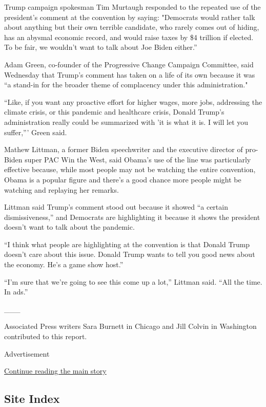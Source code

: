Trump campaign spokesman Tim Murtaugh responded to the repeated use of
the president's comment at the convention by saying: "Democrats would
rather talk about anything but their own terrible candidate, who rarely
comes out of hiding, has an abysmal economic record, and would raise
taxes by \$4 trillion if elected. To be fair, we wouldn't want to talk
about Joe Biden either.''

Adam Green, co-founder of the Progressive Change Campaign Committee,
said Wednesday that Trump's comment has taken on a life of its own
because it was ``a stand-in for the broader theme of complacency under
this administration."

``Like, if you want any proactive effort for higher wages, more jobs,
addressing the climate crisis, or this pandemic and healthcare crisis,
Donald Trump's administration really could be summarized with 'it is
what it is. I will let you suffer,''' Green said.

Mathew Littman, a former Biden speechwriter and the executive director
of pro-Biden super PAC Win the West, said Obama's use of the line was
particularly effective because, while most people may not be watching
the entire convention, Obama is a popular figure and there's a good
chance more people might be watching and replaying her remarks.

Littman said Trump's comment stood out because it showed ``a certain
dismissiveness,'' and Democrats are highlighting it because it shows the
president doesn't want to talk about the pandemic.

``I think what people are highlighting at the convention is that Donald
Trump doesn't care about this issue. Donald Trump wants to tell you good
news about the economy. He's a game show host.''

``I'm sure that we're going to see this come up a lot,'' Littman said.
``All the time. In ads.''

\_\_\_

Associated Press writers Sara Burnett in Chicago and Jill Colvin in
Washington contributed to this report.

Advertisement

\protect\hyperlink{after-bottom}{Continue reading the main story}

\hypertarget{site-index}{%
\subsection{Site Index}\label{site-index}}


